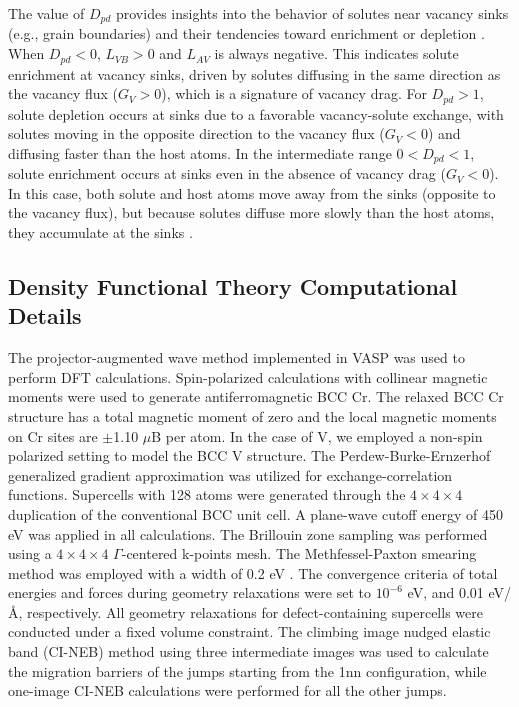 \documentclass[preprint,12pt]{elsarticle}
\begin{document}
The value of $D_{pd}$ provides insights into the behavior of solutes near vacancy sinks (e.g., grain boundaries) and their tendencies toward enrichment or depletion \citep{messina_exact_2014}. When $D_{pd} < 0$, $L_{VB} > 0$ and $L_{AV}$ is always negative. This indicates solute enrichment at vacancy sinks, driven by solutes diffusing in the same direction as the vacancy flux ($G_V > 0$), which is a signature of vacancy drag. For $D_{pd} > 1$, solute depletion occurs at sinks due to a favorable vacancy-solute exchange, with solutes moving in the opposite direction to the vacancy flux ($G_V < 0$) and diffusing faster than the host atoms. In the intermediate range $0 < D_{pd} < 1$, solute enrichment occurs at sinks even in the absence of vacancy drag ($G_V < 0$). In this case, both solute and host atoms move away from the sinks (opposite to the vacancy flux), but because solutes diffuse more slowly than the host atoms, they accumulate at the sinks \citep{messina_exact_2014}.

\FloatBarrier

\subsection{Density Functional Theory Computational Details}
\label{sec:methods:dft}
The projector-augmented wave method implemented in VASP \cite{kresse_ab_1993, kresse_efficient_1996} was used to perform DFT calculations. Spin-polarized calculations with collinear magnetic moments were used to generate antiferromagnetic BCC Cr. The relaxed BCC Cr structure has a total magnetic moment of zero and the local magnetic moments on Cr sites are $\pm$1.10 $\mu$B per atom.
In the case of V, we employed a non-spin polarized setting to model the BCC V structure.
The Perdew-Burke-Ernzerhof generalized gradient approximation \cite{perdew_generalized_1996} was utilized for exchange-correlation functions. Supercells with 128 atoms were generated through the $4\times4\times4$ duplication of the conventional BCC unit cell. A plane-wave cutoff energy of 450 eV was applied in all calculations. The Brillouin zone sampling was performed using a $4\times4\times4$ $\Gamma$-centered k-points mesh. The Methfessel-Paxton smearing method was employed with a width of 0.2 eV  \cite{methfessel_high-precision_1989}. 
The convergence criteria of total energies and forces during geometry relaxations were set to $10^{-6}$ eV, and 0.01 eV/\AA, respectively. All geometry relaxations for defect-containing supercells were conducted under a fixed volume constraint. The climbing image nudged elastic band (CI-NEB) method \cite{henkelman_climbing_2000} using three intermediate images was used to calculate the migration barriers of the jumps starting from the 1nn configuration, while one-image CI-NEB calculations were performed for all the other jumps.
\end{document}

